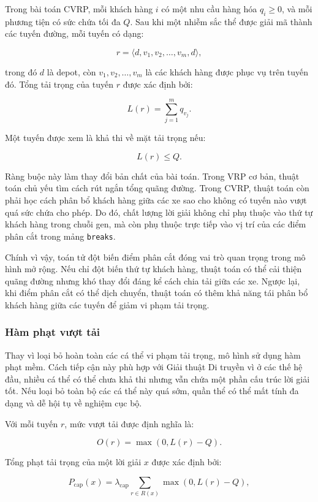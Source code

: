 \documentclass[12pt,a4paper]{article}
\numberwithin{figure}{subsection}
\renewcommand{\geq}{\geqslant}
\renewcommand{\leq}{\leqslant}
\begin{document}
Trong bài toán CVRP, mỗi khách hàng $i$ có một nhu cầu hàng hóa $q_i \geq 0$, và mỗi phương tiện có sức chứa tối đa $Q$. Sau khi một nhiễm sắc thể được giải mã thành các tuyến đường, mỗi tuyến có dạng:

\[
r = \langle d, v_1, v_2, \dots, v_m, d \rangle,
\]

trong đó $d$ là depot, còn $v_1, v_2, \dots, v_m$ là các khách hàng được phục vụ trên tuyến đó. Tổng tải trọng của tuyến $r$ được xác định bởi:

\[
L(r) = \sum_{j=1}^{m} q_{v_j}.
\]

Một tuyến được xem là khả thi về mặt tải trọng nếu:

\[
L(r) \leq Q.
\]

Ràng buộc này làm thay đổi bản chất của bài toán. Trong VRP cơ bản, thuật toán chủ yếu tìm cách rút ngắn tổng quãng đường. Trong CVRP, thuật toán còn phải học cách phân bổ khách hàng giữa các xe sao cho không có tuyến nào vượt quá sức chứa cho phép. Do đó, chất lượng lời giải không chỉ phụ thuộc vào thứ tự khách hàng trong chuỗi gen, mà còn phụ thuộc trực tiếp vào vị trí của các điểm phân cắt trong mảng \texttt{breaks}.

Chính vì vậy, toán tử đột biến điểm phân cắt đóng vai trò quan trọng trong mô hình mở rộng. Nếu chỉ đột biến thứ tự khách hàng, thuật toán có thể cải thiện quãng đường nhưng khó thay đổi đáng kể cách chia tải giữa các xe. Ngược lại, khi điểm phân cắt có thể dịch chuyển, thuật toán có thêm khả năng tái phân bổ khách hàng giữa các tuyến để giảm vi phạm tải trọng.

\subsubsection{Hàm phạt vượt tải}

Thay vì loại bỏ hoàn toàn các cá thể vi phạm tải trọng, mô hình sử dụng hàm phạt mềm. Cách tiếp cận này phù hợp với Giải thuật Di truyền vì ở các thế hệ đầu, nhiều cá thể có thể chưa khả thi nhưng vẫn chứa một phần cấu trúc lời giải tốt. Nếu loại bỏ toàn bộ các cá thể này quá sớm, quần thể có thể mất tính đa dạng và dễ hội tụ về nghiệm cục bộ.

Với mỗi tuyến $r$, mức vượt tải được định nghĩa là:

\[
O(r) = \max(0, L(r) - Q).
\]

Tổng phạt tải trọng của một lời giải $x$ được xác định bởi:

\[
P_{\text{cap}}(x)
=
\lambda_{\text{cap}}
\sum_{r \in R(x)}
\max(0, L(r) - Q),
\]
\end{document}
